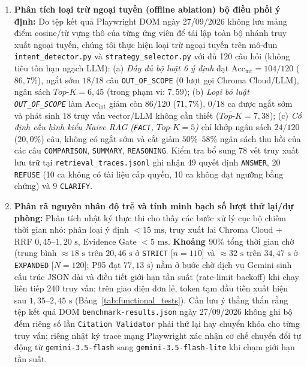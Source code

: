 \documentclass{IEEEtran}
\begin{document}
\begin{enumerate}
    \item \textbf{Phân tích loại trừ ngoại tuyến (offline ablation) bộ điều phối ý định:} Do tệp kết quả Playwright DOM ngày 27/09/2026 không lưu mảng điểm cosine/từ vựng thô của từng ứng viên để tái lập toàn bộ nhánh truy xuất ngoại tuyến, chúng tôi thực hiện loại trừ ngoại tuyến trên mô-đun \texttt{intent\_detector.py} và \texttt{strategy\_selector.py} với đủ 120 câu hỏi (không tiêu tốn hạn ngạch LLM): (a) \textit{Đầy đủ bộ luật 6 ý định} đạt $\text{Acc}_{\text{int}} = 104/120$ ($86{,}7\%$), ngắt sớm $18/18$ câu \texttt{OUT\_OF\_SCOPE} ($0$ lượt gọi Chroma Cloud/LLM), ngân sách $\overline{\textit{Top-K}} = 6{,}45$ (trong phạm vi: $7{,}59$); (b) \textit{Loại bỏ luật \texttt{OUT\_OF\_SCOPE}} làm $\text{Acc}_{\text{int}}$ giảm còn $86/120$ ($71{,}7\%$), $0/18$ ca được ngắt sớm và phát sinh 18 truy vấn vector/LLM không cần thiết ($\overline{\textit{Top-K}} = 7{,}38$); (c) \textit{Cố định cấu hình kiểu Naive RAG (\texttt{FACT}, $\textit{Top-K}=5$)} chỉ khớp ngân sách $24/120$ ($20{,}0\%$) câu, không có ngắt sớm và cắt giảm $50\%\text{--}58\%$ ngân sách thu hồi của các câu \texttt{COMPARISON}, \texttt{SUMMARY}, \texttt{REASONING}. Kiểm tra bổ sung 78 vết truy xuất lưu trữ tại \texttt{retrieval\_traces.jsonl} ghi nhận 49 quyết định \texttt{ANSWER}, 20 \texttt{REFUSE} (10 ca không có tài liệu cấp quyền, 10 ca không đạt ngưỡng bằng chứng) và 9 \texttt{CLARIFY}.
    \item \textbf{Phân rã nguyên nhân độ trễ và tính minh bạch số lượt thử lại/dự phòng:} Phân tích nhật ký thực thi cho thấy các bước xử lý cục bộ chiếm thời gian nhỏ: phân loại ý định $< 15\text{~ms}$, truy xuất lai Chroma Cloud + RRF $0{,}45\text{--}1{,}20\text{~s}$, Evidence Gate $< 5\text{~ms}$. \textbf{Khoảng $90\%$} tổng thời gian chờ (trung bình $\approx 18\text{~s}$ trên $20{,}46\text{~s}$ ở \texttt{STRICT} [$n=110$] và $\approx 32\text{~s}$ trên $34{,}47\text{~s}$ ở \texttt{EXPANDED} [$N=120$]; P95 đạt $77{,}13\text{~s}$) nằm ở bước chờ dịch vụ Gemini sinh cấu trúc JSON dài và điều tiết giới hạn tần suất (rate-limit backoff) khi chạy liên tiếp 240 truy vấn; trên giao diện đơn lẻ, token tạm đầu tiên xuất hiện sau $1{,}35\text{--}2{,}45\text{~s}$ (Bảng~\ref{tab:functional_tests}). Cần lưu ý thẳng thắn rằng tệp kết quả DOM \texttt{benchmark-results.json} ngày 27/09/2026 không ghi bộ đếm riêng số lần \texttt{Citation Validator} phải thử lại hay chuyển khóa cho từng truy vấn; riêng nhật ký trace mạng Playwright xác nhận cơ chế chuyển đổi tự động từ \texttt{gemini-3.5-flash} sang \texttt{gemini-3.5-flash-lite} khi chạm giới hạn tần suất.
\end{enumerate}
\end{document}
